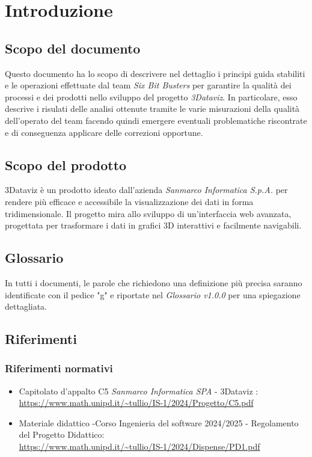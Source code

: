 \section{Introduzione}
    \subsection{Scopo del documento}
        Questo documento ha lo scopo di descrivere nel dettaglio i principi guida stabiliti e le operazioni effettuate
        dal team \textit{Six Bit Busters} per garantire la qualità dei processi e dei prodotti nello sviluppo del progetto
        \textit{3Dataviz}. In particolare, esso descrive i risulati delle analisi ottenute tramite le varie misurazioni
        della qualità dell'operato del team facendo quindi emergere eventuali problematiche riscontrate e di conseguenza
        applicare delle correzioni opportune.

    \subsection{Scopo del prodotto}

   3Dataviz è un prodotto ideato dall'azienda \textit{Sanmarco Informatica S.p.A.} per rendere più efficace e accessibile la visualizzazione dei dati in forma tridimensionale. Il progetto mira allo sviluppo di un’interfaccia web avanzata, progettata per trasformare i dati in grafici 3D interattivi e facilmente navigabili.
        
    \subsection{Glossario}
      In tutti i documenti, le parole che richiedono una definizione più precisa saranno identificate con il pedice "g" e riportate nel \textit{Glossario v1.0.0} per una spiegazione dettagliata.
        
    \subsection{Riferimenti}
        \subsubsection{Riferimenti normativi}
        \begin{itemize}
            \item Capitolato d'appalto C5 \textit{Sanmarco Informatica SPA} - 3Dataviz : \\ \url{https://www.math.unipd.it/~tullio/IS-1/2024/Progetto/C5.pdf}
            \item Materiale didattico -Corso Ingenieria del software 2024/2025 - Regolamento del Progetto Didattico: \\ \url{https://www.math.unipd.it/~tullio/IS-1/2024/Dispense/PD1.pdf}
        \end{itemize}
